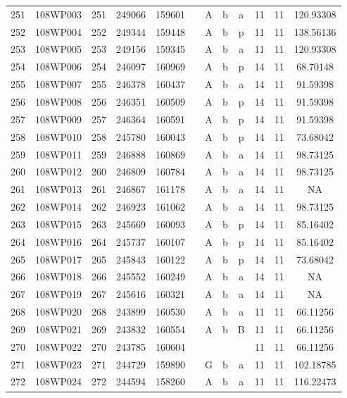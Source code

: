 \begin{tabular}{|*{12}{c|}}
251 & 108WP003 & 251 & 249066 & 159601 &  & A & b & a & 11 & 11 & 120.93308 \\ 
252 & 108WP004 & 252 & 249344 & 159448 &  & A & b & p & 11 & 11 & 138.56136 \\ 
253 & 108WP005 & 253 & 249156 & 159345 &  & A & b & a & 11 & 11 & 120.93308 \\ 
254 & 108WP006 & 254 & 246097 & 160969 &  & A & b & p & 14 & 11 & 68.70148 \\ 
255 & 108WP007 & 255 & 246378 & 160437 &  & A & b & a & 14 & 11 & 91.59398 \\ 
256 & 108WP008 & 256 & 246351 & 160509 &  & A & b & p & 14 & 11 & 91.59398 \\ 
257 & 108WP009 & 257 & 246364 & 160591 &  & A & b & p & 14 & 11 & 91.59398 \\ 
258 & 108WP010 & 258 & 245780 & 160043 &  & A & b & p & 14 & 11 & 73.68042 \\ 
259 & 108WP011 & 259 & 246888 & 160869 &  & A & b & a & 14 & 11 & 98.73125 \\ 
260 & 108WP012 & 260 & 246809 & 160784 &  & A & b & a & 14 & 11 & 98.73125 \\ 
261 & 108WP013 & 261 & 246867 & 161178 &  & A & b & a & 14 & 11 & NA \\ 
262 & 108WP014 & 262 & 246923 & 161062 &  & A & b & a & 14 & 11 & 98.73125 \\ 
263 & 108WP015 & 263 & 245669 & 160093 &  & A & b & p & 14 & 11 & 85.16402 \\ 
264 & 108WP016 & 264 & 245737 & 160107 &  & A & b & p & 14 & 11 & 85.16402 \\ 
265 & 108WP017 & 265 & 245843 & 160122 &  & A & b & p & 14 & 11 & 73.68042 \\ 
266 & 108WP018 & 266 & 245552 & 160249 &  & A & b & a & 14 & 11 & NA \\ 
267 & 108WP019 & 267 & 245616 & 160321 &  & A & b & a & 14 & 11 & NA \\ 
268 & 108WP020 & 268 & 243899 & 160530 &  & A & b & a & 11 & 11 & 66.11256 \\ 
269 & 108WP021 & 269 & 243832 & 160554 &  & A & b & B & 11 & 11 & 66.11256 \\ 
270 & 108WP022 & 270 & 243785 & 160604 &  &  &  &  & 11 & 11 & 66.11256 \\ 
271 & 108WP023 & 271 & 244729 & 159890 &  & G & b & a & 11 & 11 & 102.18785 \\ 
272 & 108WP024 & 272 & 244594 & 158260 &  & A & b & a & 11 & 11 & 116.22473 \\ 

\end{tabular}
